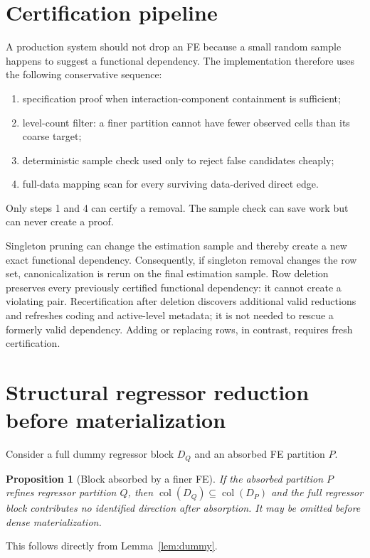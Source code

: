 \documentclass[11pt]{article}
\newtheorem{proposition}[theorem]{Proposition}
\theoremstyle{definition}
\newcommand{\col}{\operatorname{col}}
\newcommand{\1}{\mathbf{1}}
\begin{document}
\section{Certification pipeline}

A production system should not drop an FE because a small random sample happens to suggest a functional dependency. The implementation therefore uses the following conservative sequence:
\begin{enumerate}[label=\arabic*.]
  \item specification proof when interaction-component containment is sufficient;
  \item level-count filter: a finer partition cannot have fewer observed cells than its coarse target;
  \item deterministic sample check used only to reject false candidates cheaply;
  \item full-data mapping scan for every surviving data-derived direct edge.
\end{enumerate}
Only steps 1 and 4 can certify a removal. The sample check can save work but can never create a proof.

Singleton pruning can change the estimation sample and thereby create a new exact functional dependency. Consequently, if singleton removal changes the row set, canonicalization is rerun on the final estimation sample. Row deletion preserves every previously certified functional dependency: it cannot create a violating pair. Recertification after deletion discovers additional valid reductions and refreshes coding and active-level metadata; it is not needed to rescue a formerly valid dependency. Adding or replacing rows, in contrast, requires fresh certification.

\section{Structural regressor reduction before materialization}

Consider a full dummy regressor block $D_Q$ and an absorbed FE partition $P$.

\begin{proposition}[Block absorbed by a finer FE]\label{prop:absorb}
If the absorbed partition $P$ refines regressor partition $Q$, then $\col(D_Q)\subseteq\col(D_P)$ and the full regressor block contributes no identified direction after absorption. It may be omitted before dense materialization.
\end{proposition}
This follows directly from Lemma~\ref{lem:dummy}.
\end{document}
